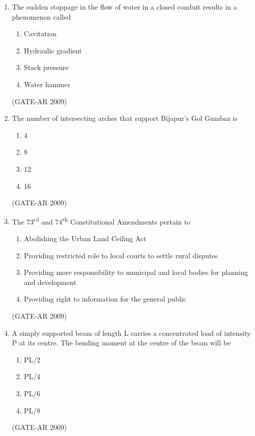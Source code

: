 \documentclass[a4paper,10pt]{article}
\begin{document}
\begin{enumerate}
    \item The sudden stoppage in the flow of water in a closed conduit results in a phenomenon called 
    \begin{multicols}{2}
	\begin{enumerate}
        \item Cavitation
        \item Hydraulic gradient
        \item Stack pressure
        \item Water hammer
    \end{enumerate}
	\end{multicols}
    \hfill (GATE-AR 2009)

    \item The number of intersecting arches that support Bijapur’s Gol Gumbaz is 
    \begin{multicols}{4}
	\begin{enumerate}
        \item 4
        \item 8
        \item 12
        \item 16
    \end{enumerate}
	\end{multicols}
    \hfill (GATE-AR 2009)
    
    \item The 73\textsuperscript{rd} and 74\textsuperscript{th} Constitutional Amendments pertain to 
    \begin{enumerate}
        \item Abolishing the Urban Land Ceiling Act
        \item Providing restricted role to local courts to settle rural disputes
        \item Providing more responsibility to municipal and local bodies for planning and development
        \item Providing right to information for the general public
    \end{enumerate}
    \hfill (GATE-AR 2009)
    
    \item A simply supported beam of length L carries a concentrated load of intensity P at its centre. The bending moment at the centre of the beam will be 
    \begin{multicols}{4}
	\begin{enumerate}
        \item PL/2
        \item PL/4
        \item PL/6
        \item PL/8
    \end{enumerate}
	\end{multicols}
    \hfill (GATE-AR 2009)


\end{enumerate}
\end{document}
